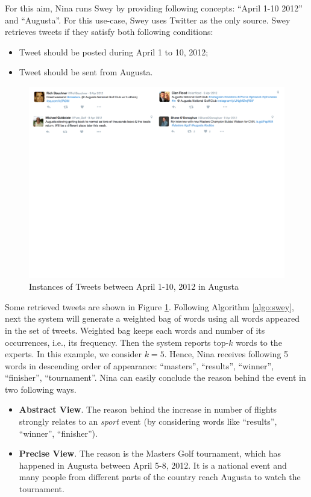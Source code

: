 \documentclass[conference]{IEEEtran}
\begin{document}
For this aim, Nina runs {\sc Swey} by providing following concepts: ``April 1-10 2012'' and ``Augusta''. For this use-case, {\sc Swey} uses Twitter as the only source. {\sc Swey} retrieves tweets if they satisfy both following conditions:
\begin{itemize}
\item Tweet should be posted during April 1 to 10, 2012;
\item Tweet should be sent from Augusta.
\end{itemize}

\begin{figure}[htpb]
\centerline{\includegraphics[width = 1\linewidth, keepaspectratio = true]{figs/tweet.pdf}}
\caption{\label{fig:tweets} Instances of Tweets between April 1-10, 2012 in Augusta}
\end{figure}

Some retrieved tweets are shown in Figure \ref{fig:tweets}. Following Algorithm \ref{algo:swey}, next the system will generate a weighted bag of words using all words appeared in the set of tweets. Weighted bag keeps each words and number of its occurrences, i.e., its frequency. Then the system reports top-$k$ words to the experts. In this example, we consider $k = 5$. Hence, Nina receives following 5 words in descending order of appearance: ``masters'', ``results'', ``winner'', ``finisher'', ``tournament''. Nina can easily conclude the reason behind the event in two following ways.

\begin{itemize}
\item {\bf Abstract View}. The reason behind the increase in number of flights strongly relates to an {\em sport} event (by considering words like ``results'', ``winner'', ``finisher''). 
\item {\bf Precise View}. The reason is the Masters Golf tournament, which has happened in Augusta between April 5-8, 2012. It is a national event and many people from different parts of the country reach Augusta to watch the tournament.
\end{itemize}
\end{document}
